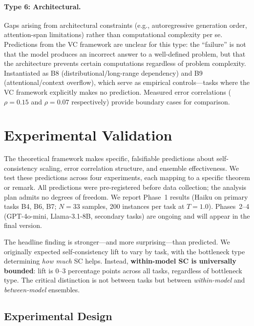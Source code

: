 \documentclass{article}
\theoremstyle{definition}
\theoremstyle{remark}
\begin{document}
\paragraph{Type 6: Architectural.}
Gaps arising from architectural constraints (e.g., autoregressive generation order, attention-span limitations) rather than computational complexity per se. Predictions from the VC framework are unclear for this type: the ``failure'' is not that the model produces an incorrect answer to a well-defined problem, but that the architecture prevents certain computations regardless of problem complexity. Instantiated as B8 (distributional/long-range dependency) and B9 (attentional/context overflow), which serve as empirical controls---tasks where the VC framework explicitly makes no prediction. Measured error correlations ($\rho = 0.15$ and $\rho = 0.07$ respectively) provide boundary cases for comparison.

\section{Experimental Validation}
\label{sec:experiments}

The theoretical framework makes specific, falsifiable predictions about self-consistency scaling, error correlation structure, and ensemble effectiveness.
We test these predictions across four experiments, each mapping to a specific theorem or remark.
All predictions were pre-registered before data collection; the analysis plan admits no degrees of freedom.
We report Phase~1 results (Haiku on primary tasks B4, B6, B7; $N = 33$ samples, 200 instances per task at $T = 1.0$).
Phases~2--4 (GPT-4o-mini, Llama-3.1-8B, secondary tasks) are ongoing and will appear in the final version.

The headline finding is stronger---and more surprising---than predicted.
We originally expected self-consistency lift to vary by task, with the bottleneck type determining \emph{how much} SC helps.
Instead, \textbf{within-model SC is universally bounded}: lift is 0--3 percentage points across all tasks, regardless of bottleneck type.
The critical distinction is not between tasks but between \emph{within-model} and \emph{between-model} ensembles.

\subsection{Experimental Design}
\label{sec:exp_design}
\end{document}
